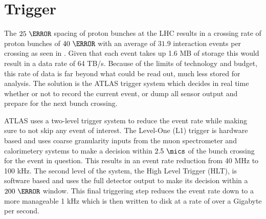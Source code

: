 \section{Trigger} \label{sec:atlas:trigger}

The $25~\ns$ spacing of proton bunches at the LHC results in a crossing rate of
proton bunches of $40~\MHz$ with an average of $31.9$ \pp interaction events per
crossing as seen in .  Given that each event takes up 1.6 MB
of storage this would result in a data rate of 64 TB/s.  Because of the limits
of technology and budget, this rate of data is far beyond what could be read
out, much less stored for analysis. The solution is the ATLAS trigger system
which decides in real time whether or not to record the current event, or dump
all sensor output and prepare for the next bunch crossing.

ATLAS uses a two-level trigger system to reduce the event rate while making
sure to not skip any event of interest.  The Level-One (L1) trigger is hardware
based and uses coarse granularity inputs from the muon spectrometer and
calorimetery systems to make a decision within $2.5~\mics$ of the bunch
crossing for the event in question. This results in an event rate reduction from
40 MHz to 100 kHz.  The second level of the system, the High Level Trigger
(HLT), is software based and uses the full detector output to make its decision
within a $200~\ms$ window. This final triggering step reduces the event rate down
to a more manageable 1 kHz which is then written to disk at a rate of over a
Gigabyte per second.
